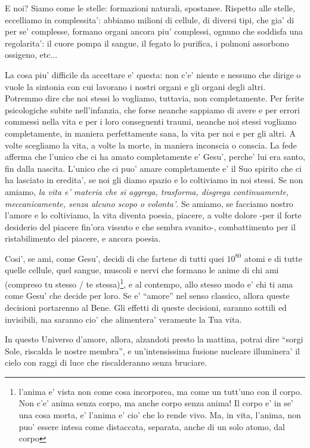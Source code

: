 E noi? Siamo come le stelle: formazioni naturali, spostanee. Rispetto alle stelle, eccelliamo in complessita': abbiamo milioni di cellule, di diversi tipi, che gia' di per se' complesse, formano organi ancora piu' complessi, ognuno che soddisfa una regolarita': il cuore pompa il sangue, il fegato lo purifica, i polmoni assorbono ossigeno, etc...

La cosa piu' difficile da accettare e' questa: non c'e' niente e nessuno che dirige o vuole la sintonia con cui lavorano i nostri organi e gli organi degli altri. Potremmo dire che noi stessi lo vogliamo, tuttavia, non completamente. Per ferite psicologiche subite nell'infanzia, che forse neanche sappiamo di avere e per errori commessi nella vita e per i loro conseguenti traumi, neanche noi stessi vogliamo completamente, in maniera perfettamente sana, la vita per noi e per gli altri. A volte scegliamo la vita, a volte la morte, in maniera inconscia o conscia. La fede afferma che l'unico che ci ha amato completamente e' Gesu', perche' lui era santo, fin dalla nascita. L'unico che ci puo' amare completamente e' il Suo spirito che ci ha lasciato in eredita', se noi gli diamo spazio e lo coltiviamo in noi stessi. Se non amiamo, \emph{la vita e' materia che si aggrega, trasforma, disgrega continuamente, meccanicamente, senza alcuno scopo o volonta'}. Se amiamo, se facciamo nostro l'amore e lo coltiviamo, la vita diventa poesia, piacere, a volte dolore -per il forte desiderio del piacere fin'ora vissuto e che sembra svanito-, combattimento per il ristabilimento del piacere, e ancora poesia. 

Cosi', se ami, come Gesu', decidi di che fartene di tutti quei $10^{80}$ atomi e di tutte quelle cellule, quel sangue, muscoli e nervi che formano le anime di chi ami (compreso tu stesso / te stessa)\footnote{l'anima e' vista non come cosa incorporea, ma come un tutt'uno con il corpo. Non c'e' anima senza corpo, ma anche corpo senza anima! Il corpo e' in se' una cosa morta, e' l'anima e' cio' che lo rende vivo. Ma, in vita, l'anima, non puo' essere intesa come distaccata, separata, anche di un solo atomo, dal corpo}, e al contempo, allo stesso modo e' chi ti ama come Gesu' che decide per loro. Se e' ``amore'' nel senso classico, allora queste decisioni portarenno al Bene. Gli effetti di queste decisioni, saranno sottili ed invisibili, ma saranno cio' che alimentera' veramente la Tua vita.

In questo Universo d'amore, allora, alzandoti presto la mattina, potrai dire ``sorgi Sole, riscalda le nostre membra'', e un'intensissima fusione nucleare illuminera' il cielo con raggi di luce che riscalderanno senza bruciare.




